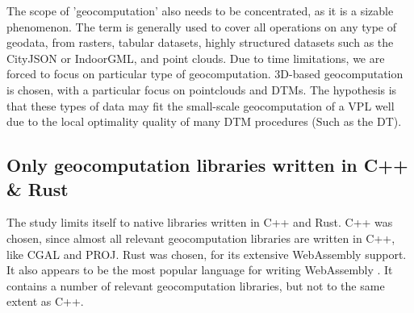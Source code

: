 The scope of 'geocomputation' also needs to be concentrated, as it is a sizable phenomenon.
The term is generally used to cover all operations on any type of geodata, from rasters, tabular datasets, highly structured datasets such as the CityJSON or IndoorGML, and point clouds. 
Due to time limitations, we are forced to focus on particular type of geocomputation.
3D-based geocomputation is chosen, with a particular focus on pointclouds and DTMs. 
The hypothesis is that these types of data may fit the small-scale geocomputation of a VPL well due to the local optimality quality of many DTM procedures (Such as the \ac{DT}). 



 
\subsection*{Only geocomputation libraries written in C++ \& Rust}

The study limits itself to native libraries written in C++ and Rust. 
C++ was chosen, since almost all relevant geocomputation libraries are written in C++, like CGAL and PROJ. 
Rust was chosen, for its extensive WebAssembly support. 
It also appears to be the most popular language for writing WebAssembly \citep{eberhardt_state_2022}.
It contains a number of relevant geocomputation libraries, but not to the same extent as C++.


